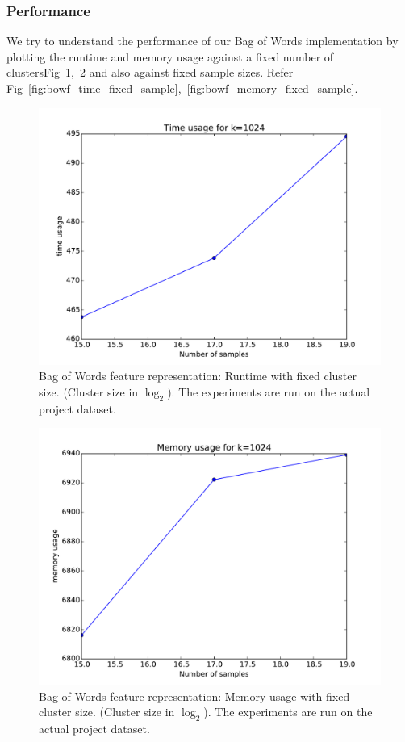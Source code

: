 \documentclass[final,leqno,onefignum,onetabnum]{siamltexmm}
\begin{document}
\subsubsection{Performance}
We try to understand the performance of our Bag of Words implementation by plotting the runtime and memory usage against a fixed number of clustersFig~\ref{fig:bowf_time_fixed_cluster},~\ref{fig:bowf_memory_fixed_cluster} and also against fixed sample sizes. Refer Fig~\ref{fig:bowf_time_fixed_sample},~\ref{fig:bowf_memory_fixed_sample}.
\begin{figure}
  \centering
  \includegraphics[width=0.60\linewidth]{images/bofwTimeFixedCluster}
  \caption{Bag of Words feature representation: Runtime with fixed cluster size. (Cluster size in $\log_{2}$).  The experiments are run on the actual project dataset.\label{fig:bowf_time_fixed_cluster}}
\end{figure}
\begin{figure}
  \centering
  \includegraphics[width=0.60\linewidth]{images/bofwMemoryFixedCluster}
  \caption{Bag of Words feature representation: Memory usage with fixed cluster size. (Cluster size in $\log_{2}$). The experiments are run on the actual project dataset.\label{fig:bowf_memory_fixed_cluster}}
\end{figure}
\end{document}
